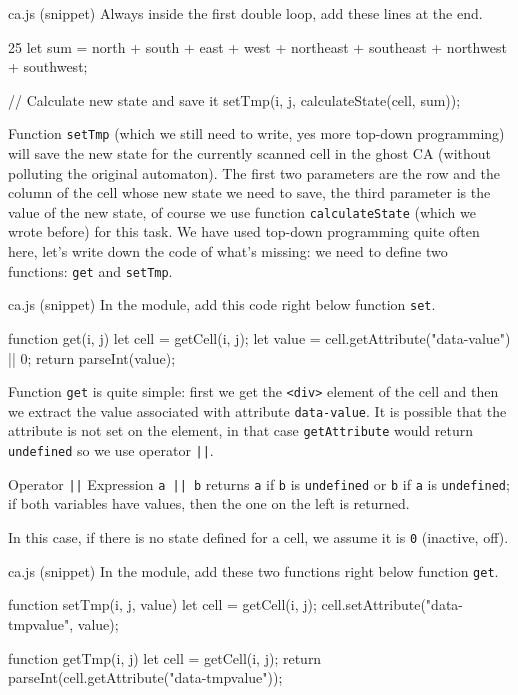 \begin{programcode}{ca.js (snippet)}
Always inside the first double loop, add these lines at the end.
\begin{codeh1}{2}{5}
let sum = north + south + east + west + northeast + southeast + northwest + southwest;

// Calculate new state and save it
setTmp(i, j, calculateState(cell, sum));
\end{codeh1}
\end{programcode}

Function \texttt{setTmp} (which we still need to write, yes more top-down programming) will save the new state
for the currently scanned cell in the ghost CA (without polluting the original automaton).
The first two parameters are the row and the column of the cell whose
new state we need to save, the third parameter is the value of the new state, of course we use function
\texttt{calculateState} (which we wrote before) for this task. We have used top-down programming quite often here,
let's write down the code of what's missing: we need to define two functions: \texttt{get} and \texttt{setTmp}.

\begin{programcode}{ca.js (snippet)}
In the module, add this code right below function \texttt{set}.
\begin{code}
function get(i, j) {
  let cell = getCell(i, j);
  let value = cell.getAttribute("data-value") || 0;
  return parseInt(value);
}
\end{code}
\end{programcode}

Function \texttt{get} is quite simple: first we get the \texttt{<div>} element of the cell and then we
extract the value associated with attribute \texttt{data-value}. It is possible that the attribute
is not set on the element, in that case \texttt{getAttribute} would return \texttt{undefined} so we
use operator \texttt{||}.

\begin{tips}{Operator \texttt{||}}
Expression \texttt{a || b} returns \texttt{a} if \texttt{b} is \texttt{undefined}
or \texttt{b} if \texttt{a} is \texttt{undefined}; if both variables have values, then the one on the
left is returned.
\end{tips}

In this case, if there is no state defined for a cell, we assume it is \texttt{0}
(inactive, off).

\begin{programcode}{ca.js (snippet)}
In the module, add these two functions right below function \texttt{get}.
\begin{code}
function setTmp(i, j, value) {
  let cell = getCell(i, j);
  cell.setAttribute("data-tmpvalue", value);
}

function getTmp(i, j) {
  let cell = getCell(i, j);
  return parseInt(cell.getAttribute("data-tmpvalue"));
}
\end{code}
\end{programcode}

